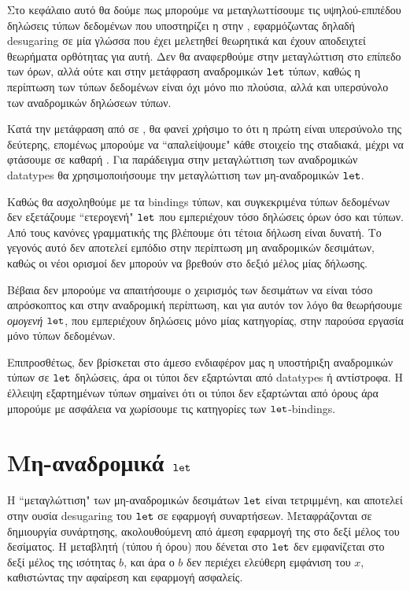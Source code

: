 \documentclass[diploma]{softlab-thesis}
\begin{document}
Στο κεφάλαιο αυτό θα δούμε πως μπορούμε να μεταγλωττίσουμε τις υψηλού-επιπέδου
δηλώσεις τύπων δεδομένων που υποστηρίζει η \FIR{} στην \FOMF, εφαρμόζωντας δηλαδή
desugaring σε μία γλώσσα που έχει μελετηθεί θεωρητικά και έχουν αποδειχτεί θεωρήματα
ορθότητας για αυτή. Δεν θα αναφερθούμε στην μεταγλώττιση στο επίπεδο των όρων, αλλά
ούτε και στην μετάφραση αναδρομικών $\operatorname{\texttt{let}}$ τύπων, καθώς η περίπτωση των τύπων δεδομένων
είναι όχι μόνο πιο πλούσια, αλλά και υπερσύνολο των αναδρομικών δηλώσεων τύπων. 


Κατά την μετάφραση από \FIR{} σε \FOMF{}, θα φανεί χρήσιμο το ότι η πρώτη είναι υπερσύνολο
της δεύτερης, επομένως μπορούμε να ``απαλείψουμε" κάθε στοιχείο της \FIR{} σταδιακά, μέχρι
να φτάσουμε σε καθαρή \FOMF{}. Για παράδειγμα στην μεταγλώττιση των αναδρομικών datatypes
θα χρησιμοποιήσουμε την μεταγλώττιση των μη-αναδρομικών $\operatorname{\texttt{let}}$. 

Καθώς θα ασχοληθούμε με τα bindings τύπων, και συγκεκριμένα τύπων δεδομένων δεν εξετάζουμε
``ετερογενή" $\operatorname{\texttt{let}}$ που εμπεριέχουν τόσο δηλώσεις όρων όσο και τύπων. Από τους κανόνες 
γραμματικής της \FIR{} βλέπουμε ότι τέτοια δήλωση είναι δυνατή. Το γεγονός αυτό δεν αποτελεί
εμπόδιο στην περίπτωση μη αναδρομικών δεσιμάτων, καθώς οι νέοι ορισμοί δεν μπορούν να βρεθούν
στο δεξιό μέλος μίας δήλωσης.

Βέβαια δεν μπορούμε να απαιτήσουμε ο χειρισμός των δεσιμάτων να είναι τόσο απρόσκοπτος και στην
αναδρομική περίπτωση, και για αυτόν τον λόγο θα θεωρήσουμε \emph{ομογενή} $\operatorname{\texttt{let}}$, που εμπεριέχουν
δηλώσεις μόνο μίας κατηγορίας, στην παρούσα εργασία μόνο τύπων δεδομένων.

Επιπροσθέτως, δεν βρίσκεται στο άμεσο ενδιαφέρον μας η υποστήριξη αναδρομικών τύπων σε $\operatorname{\texttt{let}}$ 
δηλώσεις, άρα οι τύποι δεν εξαρτώνται από datatypes ή αντίστροφα. Η έλλειψη εξαρτημένων τύπων
σημαίνει ότι οι τύποι δεν εξαρτώνται από όρους άρα μπορούμε με ασφάλεια να χωρίσουμε τις κατηγορίες
των $\operatorname{\texttt{let}}$-bindings.

\section{Μη-αναδρομικά $\operatorname{\texttt{let}}$}

Η ``μεταγλώττιση" των μη-αναδρομικών δεσιμάτων $\operatorname{\texttt{let}}$ είναι τετριμμένη, και αποτελεί στην ουσία
desugaring του $\operatorname{\texttt{let}}$ σε εφαρμογή συναρτήσεων. Μεταφράζονται σε δημιουργία συνάρτησης, ακολουθούμενη από άμεση εφαρμογή της στο δεξί μέλος του δεσίματος. Η μεταβλητή (τύπου ή όρου)
που δένεται στο $\operatorname{\texttt{let}}$ δεν εμφανίζεται στο δεξί μέλος της ισότητας $b$, και άρα ο $b$ δεν περιέχει
ελεύθερη εμφάνιση του $x$, καθιστώντας την αφαίρεση και εφαρμογή ασφαλείς.
\end{document}
